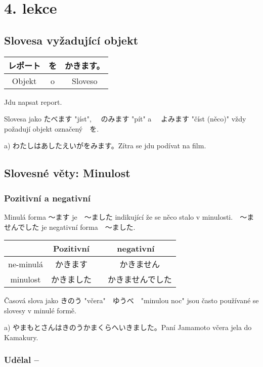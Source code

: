 \section{4. lekce}
\label{sec:lekce_4}

\subsection{Slovesa vyžadující objekt}
\begin{center}
\begin{tabular}{||c|c||c||}
\hline
レポート&を&かきます。\\
\hline
Objekt&o&Sloveso\\
\hline
\end{tabular}
\end{center}
Jdu napsat report.

Slovesa jako たべます "jíst", 　のみます "pít" a 　よみます "číst (něco)" vždy požadují objekt označený　を.　

a) わたしはあしたえいがをみます。Zítra se jdu podívat na film.

\subsection{Slovesné věty: Minulost}
\subsubsection{Pozitivní a negativní}

Minulá forma 〜ます je　〜ました indikující že se něco stalo v minulosti.　〜ませんでした je negativní forma　〜ました.
\begin{center}
\begin{tabular}{|c|c|c|}
\hline
&Pozitivní&negativní\\
\hline
ne-minulá&かきます&　かきません\\
\hline
minulost&かきました&　かきませんでした\\
\hline
\end{tabular}
\end{center}

Časová slova jako きのう "včera"　ゆうべ　"minulou noc" jsou často používané se slovesy v minulé formě.

a) やまもとさんはきのうかまくらへいきました。Paní Jamamoto včera jela do Kamakury. 

\subsubsection{Udělal --}

